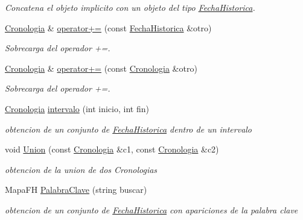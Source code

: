 \begin{DoxyCompactItemize}
\begin{DoxyCompactList}\small\item\em Concatena el objeto implicito con un objeto del tipo \hyperlink{classFechaHistorica}{Fecha\+Historica}. \end{DoxyCompactList}\item 
\hyperlink{classCronologia}{Cronologia} \& \hyperlink{classCronologia_a7e6b4c1621dfba75b113819a6b32e2ef}{operator+=} (const \hyperlink{classFechaHistorica}{Fecha\+Historica} \&otro)
\begin{DoxyCompactList}\small\item\em Sobrecarga del operador +=. \end{DoxyCompactList}\item 
\hyperlink{classCronologia}{Cronologia} \& \hyperlink{classCronologia_a5eb738cdce8fd5b7239a384476ddef7f}{operator+=} (const \hyperlink{classCronologia}{Cronologia} \&otro)
\begin{DoxyCompactList}\small\item\em Sobrecarga del operador +=. \end{DoxyCompactList}\item 
\hyperlink{classCronologia}{Cronologia} \hyperlink{classCronologia_acd418bfc323c6fbac776419bddac74e8}{intervalo} (int inicio, int fin)
\begin{DoxyCompactList}\small\item\em obtencion de un conjunto de \hyperlink{classFechaHistorica}{Fecha\+Historica} dentro de un intervalo \end{DoxyCompactList}\item 
void \hyperlink{classCronologia_a5dd879f6d755f01f3af65334bcabec0c}{Union} (const \hyperlink{classCronologia}{Cronologia} \&c1, const \hyperlink{classCronologia}{Cronologia} \&c2)
\begin{DoxyCompactList}\small\item\em obtencion de la union de dos Cronologias \end{DoxyCompactList}\item 
Mapa\+FH \hyperlink{classCronologia_a43b561e8e1e896372f797247058a4a0d}{Palabra\+Clave} (string buscar)
\begin{DoxyCompactList}\small\item\em obtencion de un conjunto de \hyperlink{classFechaHistorica}{Fecha\+Historica} con apariciones de la palabra clave \end{DoxyCompactList}\item 
\mbox{\label{classCronologia_abbfd6e21bbb97bc71ad0d8bdfbc158b9}} 

\end{DoxyCompactItemize}
